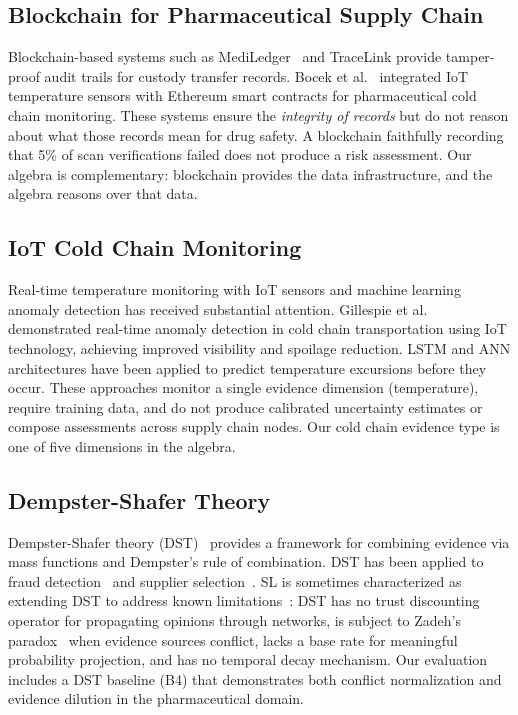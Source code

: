 \documentclass[conference]{IEEEtran}
\begin{document}
\subsection{Blockchain for Pharmaceutical Supply Chain}

Blockchain-based systems such as MediLedger~\cite{mediledger} and
TraceLink provide tamper-proof audit trails for custody transfer
records. Bocek et al.~\cite{bocek2017} integrated IoT temperature
sensors with Ethereum smart contracts for pharmaceutical cold chain
monitoring. These systems ensure the \textit{integrity of records} but
do not reason about what those records mean for drug safety. A
blockchain faithfully recording that 5\% of scan verifications failed
does not produce a risk assessment. Our algebra is complementary:
blockchain provides the data infrastructure, and the algebra reasons
over that data.

\subsection{IoT Cold Chain Monitoring}

Real-time temperature monitoring with IoT sensors and machine learning
anomaly detection has received substantial attention. Gillespie et
al.~\cite{coldchain_iot2023} demonstrated real-time anomaly detection
in cold chain transportation using IoT technology, achieving improved
visibility and spoilage reduction. LSTM and ANN architectures have been
applied to predict temperature excursions before they occur. These
approaches monitor a single evidence dimension (temperature), require
training data, and do not produce calibrated uncertainty estimates or
compose assessments across supply chain nodes. Our cold chain evidence
type is one of five dimensions in the algebra.

\subsection{Dempster-Shafer Theory}

Dempster-Shafer theory (DST)~\cite{shafer1976} provides a framework for
combining evidence via mass functions and Dempster's rule of
combination. DST has been applied to fraud detection~\cite{ds_fraud2021}
and supplier selection~\cite{ds_supplier2017}. SL is sometimes
characterized as extending DST to address known
limitations~\cite{josang2016}: DST has no trust discounting operator for
propagating opinions through networks, is subject to Zadeh's
paradox~\cite{zadeh1984} when evidence sources conflict, lacks a base
rate for meaningful probability projection, and has no temporal decay
mechanism. Our evaluation includes a DST baseline (B4) that
demonstrates both conflict normalization and evidence dilution in the
pharmaceutical domain.
\end{document}
